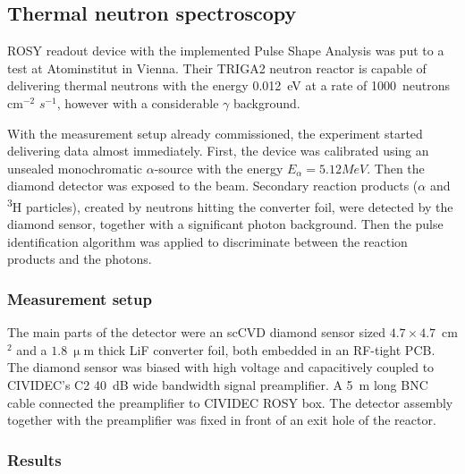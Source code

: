 \documentclass[12pt]{mytustyle}  %
\begin{document}
\subsection{Thermal neutron spectroscopy}
ROSY readout device with the implemented Pulse Shape Analysis was put to a test at Atominstitut in Vienna. Their TRIGA2 neutron reactor is capable of delivering thermal neutrons with the energy 0.012~eV at a rate of 1000~neutrons cm$^{-2}$ $s^{-1}$, however with a considerable $\gamma$ background. 

With the measurement setup already commissioned, the experiment started delivering data almost immediately. First, the device was calibrated using an unsealed monochromatic $\alpha$-source with the energy $E_\alpha=5.12MeV$. Then the diamond detector was exposed to the beam. Secondary reaction products ($\alpha$ and \textsuperscript{3}H particles), created by neutrons hitting the converter foil, were detected by the diamond sensor, together with a significant photon background. Then the pulse identification algorithm was applied to discriminate between the reaction products and the photons.

\subsubsection{Measurement setup}
The main parts of the detector were an scCVD diamond sensor sized $4.7\times4.7$~cm$^2$ and a $1.8~\upmu$m thick LiF converter foil, both embedded in an RF-tight PCB. The diamond sensor was biased with high voltage and capacitively coupled to CIVIDEC's C2 40~dB wide bandwidth signal preamplifier. A 5~m long BNC cable connected the preamplifier to CIVIDEC ROSY box. The detector assembly together with the preamplifier was fixed in front of an exit hole of the reactor.



\subsubsection{Results}





\end{document}
